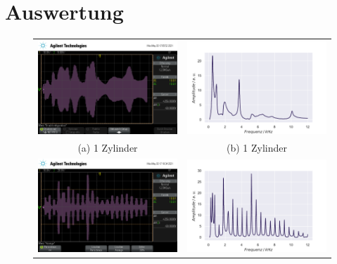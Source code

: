 \section{Auswertung}
\label{sec:auswertung}

\begin{figure}
    \centering
    \begin{tabular}{cc}
      \includegraphics[width=65mm]{Daten/Zyinder/Zylinder_1.png} &   \includegraphics[width=65mm]{Daten/Zyinder/Zylinder_1.pdf} \\
    (a) 1 Zylinder & (b) 1 Zylinder \\[6pt]
     \includegraphics[width=65mm]{Daten/Zyinder/Zylinder_6.png} &   \includegraphics[width=65mm]{Daten/Zyinder/Zylinder_6.pdf} \\

\end{tabular}
\end{figure}
